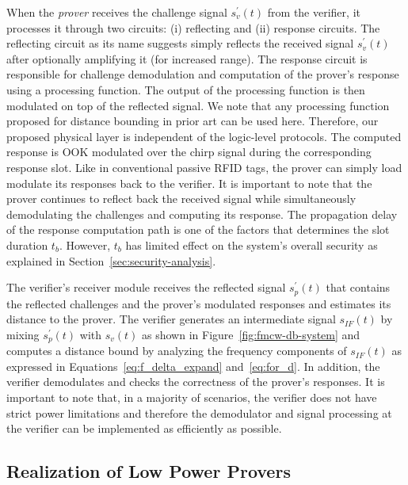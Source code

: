 \documentclass{sig-alternate-10pt}
\begin{document}
When the \emph{prover} receives the challenge signal $s_v^\prime(t)$ from the
verifier, it processes it through two circuits: (i) reflecting and (ii) response
circuits. The reflecting circuit as its name suggests simply reflects the
received signal $s_v^\prime(t)$ after optionally amplifying it (for increased
range). The response circuit is responsible for challenge demodulation and
computation of the prover's response using a processing function. The output of
the processing function is then modulated on top of the reflected signal. We
note that any processing function proposed for distance bounding in prior art
can be used here. Therefore, our proposed physical layer is independent of the
logic-level protocols. The computed response is OOK modulated over the chirp
signal during the corresponding response slot. Like in conventional passive RFID
tags, the prover can simply load modulate its responses back to the verifier. It
is important to note that the prover continues to reflect back the received
signal while simultaneously demodulating the challenges and computing its
response. The propagation delay of the response computation path is one of the
factors that determines the slot duration $t_b$. However, $t_b$ has limited
effect on the system's overall security as explained in
Section~\ref{sec:security-analysis}.

The verifier's receiver module receives the reflected signal $s_p^\prime(t)$
that contains the reflected challenges and the prover's modulated responses and
estimates its distance to the prover. The verifier generates an intermediate
signal $s_{IF}(t)$ by mixing $s_p^\prime(t)$ with $s_v(t)$ as shown in
Figure~\ref{fig:fmcw-db-system} and computes a distance bound by analyzing the
frequency components of $s_{IF}(t)$ as expressed in
Equations~\eqref{eq:f_delta_expand} and~\eqref{eq:for_d}. In addition, the
verifier demodulates and checks the correctness of the prover's responses. It is
important to note that, in a majority of scenarios, the verifier does not have
strict power limitations and therefore the demodulator and signal processing at
the verifier can be implemented as efficiently as possible.

\subsection{Realization of Low Power Provers}
\label{sec:low-power-prover}
\end{document}
